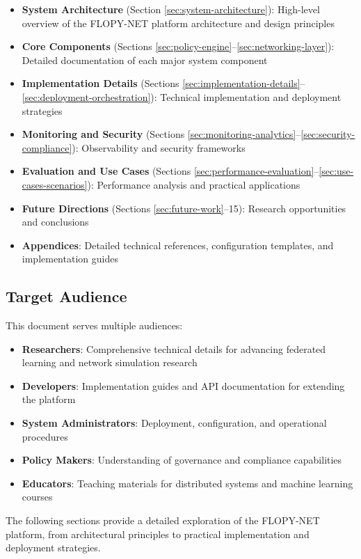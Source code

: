 \begin{itemize}
    \item \textbf{System Architecture} (Section \ref{sec:system-architecture}): High-level overview of the FLOPY-NET platform architecture and design principles
    \item \textbf{Core Components} (Sections \ref{sec:policy-engine}--\ref{sec:networking-layer}): Detailed documentation of each major system component
    \item \textbf{Implementation Details} (Sections \ref{sec:implementation-details}--\ref{sec:deployment-orchestration}): Technical implementation and deployment strategies
    \item \textbf{Monitoring and Security} (Sections \ref{sec:monitoring-analytics}--\ref{sec:security-compliance}): Observability and security frameworks
    \item \textbf{Evaluation and Use Cases} (Sections \ref{sec:performance-evaluation}--\ref{sec:use-cases-scenarios}): Performance analysis and practical applications
    \item \textbf{Future Directions} (Sections \ref{sec:future-work}--15): Research opportunities and conclusions
    \item \textbf{Appendices}: Detailed technical references, configuration templates, and implementation guides
\end{itemize}

\subsection{Target Audience}

This document serves multiple audiences:

\begin{itemize}
    \item \textbf{Researchers}: Comprehensive technical details for advancing federated learning and network simulation research
    \item \textbf{Developers}: Implementation guides and API documentation for extending the platform
    \item \textbf{System Administrators}: Deployment, configuration, and operational procedures
    \item \textbf{Policy Makers}: Understanding of governance and compliance capabilities
    \item \textbf{Educators}: Teaching materials for distributed systems and machine learning courses
\end{itemize}

The following sections provide a detailed exploration of the FLOPY-NET platform, from architectural principles to practical implementation and deployment strategies.
